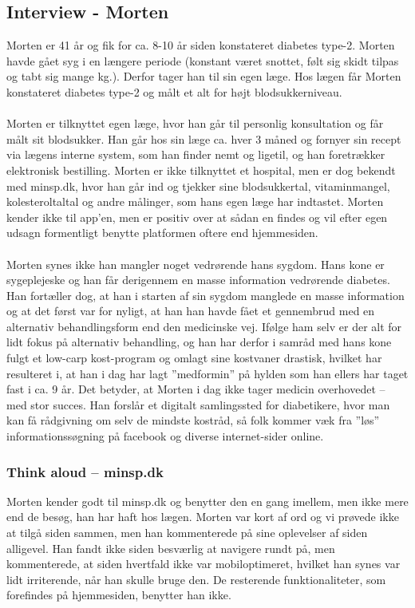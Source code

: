 \subsection{Interview - Morten}
Morten er 41 år og fik for ca. 8-10 år siden konstateret diabetes type-2. Morten havde gået syg i en længere periode (konstant været snottet, følt sig skidt tilpas og tabt sig mange kg.). Derfor tager han til sin egen læge. Hos lægen får Morten konstateret diabetes type-2 og målt et alt for højt blodsukkerniveau.
\\ \\
Morten er tilknyttet egen læge, hvor han går til personlig konsultation og får målt sit blodsukker. Han går hos sin læge ca. hver 3 måned og fornyer sin recept via lægens interne system, som han finder nemt og ligetil, og han foretrækker elektronisk bestilling. Morten er ikke tilknyttet et hospital, men er dog bekendt med minsp.dk, hvor han går ind og tjekker sine blodsukkertal, vitaminmangel, kolesteroltaltal og andre målinger, som hans egen læge har indtastet. Morten kender ikke til app'en, men er positiv over at sådan en findes og vil efter egen udsagn formentligt benytte platformen oftere end hjemmesiden. 
\\ \\
Morten synes ikke han mangler noget vedrørende hans sygdom. Hans kone er sygeplejeske og han får derigennem en masse information vedrørende diabetes. Han fortæller dog, at han i starten af sin sygdom manglede en masse information og at det først var for nyligt, at han han havde fået et gennembrud med en alternativ behandlingsform end den medicinske vej. Ifølge ham selv er der alt for lidt fokus på alternativ behandling, og han har derfor i samråd med hans kone fulgt et low-carp kost-program og omlagt sine kostvaner drastisk, hvilket har resulteret i, at han i dag har lagt ”medformin” på hylden som han ellers har taget fast i ca. 9 år. Det betyder, at Morten i dag ikke tager medicin overhovedet – med stor succes. Han forslår et digitalt samlingssted for diabetikere, hvor man kan få rådgivning om selv de mindste kostråd, så folk kommer væk fra ”løs” informationssøgning på facebook og diverse internet-sider online. 

\subsubsection*{Think aloud – minsp.dk}
Morten kender godt til minsp.dk og benytter den en gang imellem, men ikke mere end de besøg, han har haft hos lægen. Morten var kort af ord og vi prøvede ikke at tilgå siden sammen, men han kommenterede på sine oplevelser af siden alligevel. Han fandt ikke siden besværlig at navigere rundt på, men kommenterede, at siden hvertfald ikke var mobiloptimeret, hvilket han synes var lidt irriterende, når han skulle bruge den. De resterende funktionaliteter, som forefindes på hjemmesiden, benytter han ikke.
